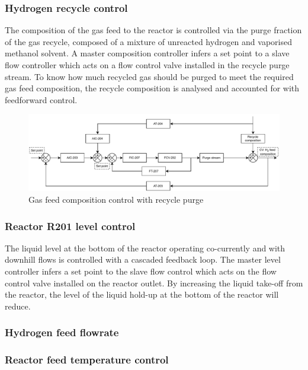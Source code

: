 \subsubsection{Hydrogen recycle control}%
The composition of the gas feed to the reactor is controlled via the purge fraction of the gas recycle, composed of a mixture of unreacted hydrogen and vaporised methanol solvent. A master composition controller infers a set point to a slave flow controller which acts on a flow control valve installed in the recycle purge stream. To know how much recycled gas should be purged to meet the required gas feed composition, the recycle composition is analysed and accounted for with feedforward control. 

\begin{figure}[H]
    \centering
    \includegraphics[width=0.8\linewidth]{chapters/4-operation-control/4-Figures/V202-CC.pdf}
    \caption{Gas feed composition control with recycle purge}
    \label{fig:V202-CC}
\end{figure}

\subsubsection{Reactor R201 level control} %
The liquid level at the bottom of the reactor operating co-currently and with downhill flows is controlled with a cascaded feedback loop. The master level controller infers a set point to the slave flow control which acts on the flow control valve installed on the reactor outlet. By increasing the liquid take-off from the reactor, the level of the liquid hold-up at the bottom of the reactor will reduce.


\subsubsection{Hydrogen feed flowrate} %








\subsubsection{Reactor feed temperature control}%

